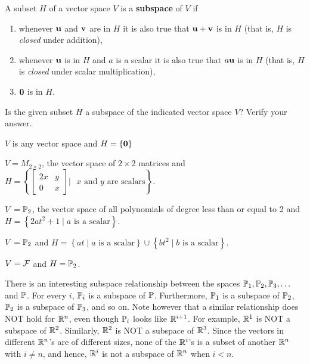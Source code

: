 \begin{definition} \label{def:5_a_subspace} A subset $H$ of a vector space $V$ is a \textbf{subspace} of $V$ if
\begin{enumerate}
\item whenever $\mathbf{u}$ and $\mathbf{v}$ are in $H$ it is also true that $\mathbf{u} + \mathbf{v}$ is in $H$ (that is, $H$ is \emph{closed} under addition),
\item whenever $\mathbf{u}$ is in $H$ and $a$ is a scalar it is also true that $a\mathbf{u}$ is in $H$ (that is, $H$ is \emph{closed} under scalar multiplication),
\item $\mathbf{0}$ is in $H$.
\end{enumerate}
\end{definition}


\begin{activity} \label{act:5_a_3} Is the given subset $H$ a subspace of the indicated vector space $V$? Verify your answer.
    \ba
    \item $V$ is any vector space and $H = \{\mathbf{0}\}$
    
		
    \item $V = M_{2 \times 2}$, the vector space of $2 \times 2$ matrices and $H = \left\{ \left[ \begin{array}{cc} 2x&y \\ 0 & x \end{array} \right] \big| \text{ $x$ and $y$ are scalars} \right\}$.


    \item $V = \mathbb{P}_2$, the vector space of all polynomials of degree less than or equal to 2 and $H = \left\{ 2at^2+1 \mid a \text{ is a scalar} \right\}$. 
    

    \item $V=\mathbb{P}_2$ and $H=\left\{at\mid a \text{ is a scalar} \right\} \cup \left\{bt^2\mid b \text{ is a scalar} \right\}$.
    
    \item $V=\mathcal{F}$ and $H=\mathbb{P}_2$.
    
    \ea
\end{activity}



There is an interesting subspace relationship between the spaces $\mathbb{P}_1, \mathbb{P}_2, \mathbb{P}_3, \ldots$ and $\mathbb{P}$. For every $i$, $\mathbb{P}_i$ is a subspace of $\mathbb{P}$. Furthermore, $\mathbb{P}_1$ is a subspace of $\mathbb{P}_2$, $\mathbb{P}_2$ is a subspace of $\mathbb{P}_3$, and so on. Note however that a similar relationship does NOT hold for $\mathbb{R}^n$, even though $\mathbb{P}_i$ looks like $\mathbb{R}^{i+1}$. For example, $\mathbb{R}^1$ is NOT a subspace of $\mathbb{R}^2$. Similarly, $\mathbb{R}^2$ is NOT a subspace of $\mathbb{R}^3$. Since the vectors in different $\mathbb{R}^n$'s are of different sizes, none of the $\mathbb{R}^i$'s is a subset of another $\mathbb{R}^n$ with $i \neq n$, and hence, $\mathbb{R}^i$ is not a subspace of $\mathbb{R}^n$ when $i<n$.

